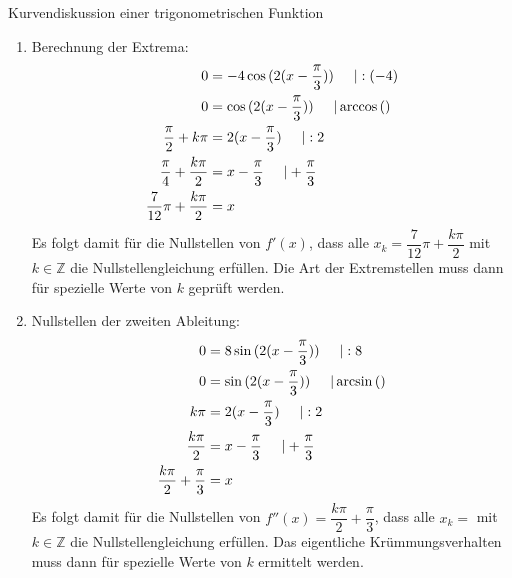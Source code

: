 \begin{bsp}{Kurvendiskussion einer trigonometrischen Funktion}{}
\begin{enumerate}
\begin{equation*}
\begin{split}
                    &= -4\cos{(2(x-\frac{\pi}{3}))}\\
                    f''(x) &= 4\sin{(2(x-\frac{\pi}{3}))}\cdot 2\\
                    &= 8\sin{(2(x-\frac{\pi}{3}))} 
                \end{split}
            \end{equation*}
            \item Berechnung der Extrema:
            \begin{equation*}
                \begin{split}
                    0&= -4\cos{(2(x-\frac{\pi}{3}))} \hspace{0.5cm} | :(-4)\\
                    0&= \cos{(2(x-\frac{\pi}{3}))}\hspace{0.5cm} | \arccos{()}\\
                    \dfrac{\pi}{2} + k\pi &= 2(x-\frac{\pi}{3}) \hspace{0.5cm} |:2\\
                    \dfrac{\pi}{4} +\dfrac{k\pi}{2} &=x-\frac{\pi}{3} \hspace{0.5cm}| +\frac{\pi}{3}\\
                    \dfrac{7}{12}\pi + \dfrac{k\pi}{2} &= x
                \end{split}
            \end{equation*}
             Es folgt damit für die Nullstellen von $f'(x)$, dass alle $x_k=\dfrac{7}{12} \pi +\dfrac{k\pi}{2}$ mit $k\in \mathds{Z}$ die Nullstellengleichung erfüllen.
Die Art der Extremstellen muss dann für spezielle Werte von $k$ geprüft werden.
\item Nullstellen der zweiten Ableitung:
\begin{equation*}
    \begin{split}
        0&= 8\sin{(2(x-\frac{\pi}{3}))}\hspace{0.5cm} | :8\\
        0&= \sin{(2(x-\frac{\pi}{3}))}\hspace{0.5cm} | \arcsin{()}\\
        k\pi&= 2(x-\frac{\pi}{3}) \hspace{0.5cm} | :2\\
        \dfrac{k\pi}{2} &= x-\frac{\pi}{3} \hspace{0.5cm} |+\frac{\pi}{3}\\
        \dfrac{k\pi}{2} +\frac{\pi}{3} &= x
    \end{split}
\end{equation*}
             Es folgt damit für die Nullstellen von $f''(x)= \dfrac{k\pi}{2} +\dfrac{\pi}{3}$, dass alle $x_k=$ mit $k\in \mathds{Z}$ die Nullstellengleichung erfüllen.
Das eigentliche Krümmungsverhalten muss dann für spezielle Werte von $k$ ermittelt werden.


\end{enumerate}
\end{bsp}
